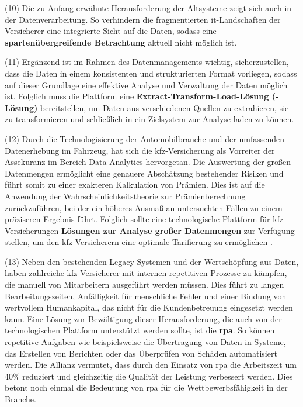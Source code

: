 (10) Die zu Anfang erwähnte Herausforderung der Altsysteme zeigt sich auch in der Datenverarbeitung. So verhindern die fragmentierten \ac{it}-Landschaften der Versicherer eine integrierte Sicht auf die Daten, sodass eine \textbf{spartenübergreifende Betrachtung} aktuell nicht möglich ist. \autocite[Vgl.][S. 11]{GUNTER2020}

(11) Ergänzend ist im Rahmen des Datenmanagements wichtig, sicherzustellen, dass die Daten in einem konsistenten und strukturierten Format vorliegen, sodass auf dieser Grundlage eine effektive Analyse und Verwaltung der Daten möglich ist. Folglich muss die Plattform eine \textbf{Extract-Transform-Load-Lösung (-Lösung)} bereitstellen, um Daten aus verschiedenen Quellen zu extrahieren, sie zu transformieren und schließlich in ein Zielsystem zur Analyse laden zu können. \autocite[Vgl.][]{WEINGARTNER2023}

(12) Durch die Technologisierung der Automobilbranche und der umfassenden Datenerhebung im Fahrzeug, hat sich die \ac{kfz}-Versicherung als Vorreiter der Assekuranz im Bereich Data Analytics hervorgetan. \autocite[Vgl.][S. 187]{GATZERT2023} Die Auswertung der großen Datenmengen ermöglicht eine genauere Abschätzung bestehender Risiken und führt somit zu einer exakteren Kalkulation von Prämien. Dies ist auf die Anwendung der Wahrscheinlichkeitstheorie zur Prämienberechnung zurückzuführen, bei der ein höheres Ausmaß an untersuchten Fällen zu einem präziseren Ergebnis führt. Folglich sollte eine technologische Plattform für \ac{kfz}-Versicherungen \textbf{Lösungen zur Analyse großer Datenmengen} zur Verfügung stellen, um den \ac{kfz}-Versicherern eine optimale Tarifierung zu ermöglichen \autocite[Vgl.][S. 146]{MANGEI2019}. 

(13) Neben den bestehenden Legacy-Systemen und der Wertschöpfung aus Daten, haben zahlreiche \ac{kfz}-Versicherer mit internen repetitiven Prozesse zu kämpfen, die manuell von Mitarbeitern ausgeführt werden müssen. Dies führt zu langen Bearbeitungszeiten, Anfälligkeit für menschliche Fehler und einer Bindung von wertvollem Humankapital, das nicht für die Kundenbetreuung eingesetzt werden kann. Eine Lösung zur Bewältigung dieser Herausforderung, die auch von der technologischen Plattform unterstützt werden sollte, ist die \textbf{\ac{rpa}}. So können repetitive Aufgaben wie beispielsweise die Übertragung von Daten in Systeme, das Erstellen von Berichten oder das Überprüfen von Schäden automatisiert werden. \autocite[Vgl.][S. 296-298]{REICH2019} Die Allianz vermutet, dass durch den Einsatz von \ac{rpa} die Arbeitszeit um 40\% reduziert und gleichzeitig die Qualität der Leistung verbessert werden. Dies betont noch einmal die Bedeutung von \ac{rpa} für die Wettbewerbsfähigkeit in der Branche. \autocite[Vgl.][S. 296-298]{REICH2019}

